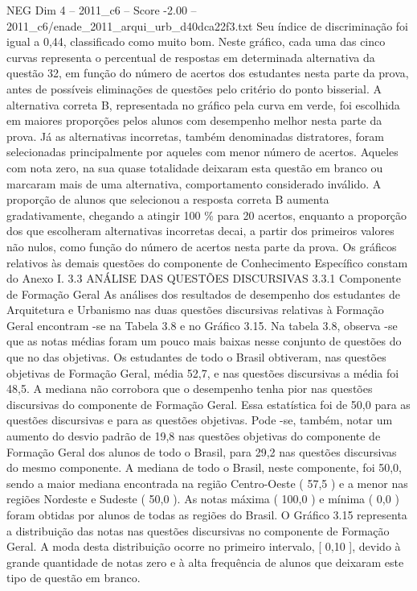 \begin{textsample}{NEG Dim 4 – 2011\_c6 – Score -2.00 – 2011\_c6/enade\_2011\_arqui\_urb\_d40dca22f3.txt}
Seu índice de discriminação foi igual a 0,44, classificado como muito bom.
Neste gráfico, cada uma das cinco curvas representa o percentual de respostas em determinada alternativa da questão 32, em função do número de acertos dos estudantes nesta parte da prova, antes de possíveis eliminações de questões pelo critério do ponto bisserial.
A alternativa correta B, representada no gráfico pela curva em verde, foi escolhida em maiores proporções pelos alunos com desempenho melhor nesta parte da prova.
Já as alternativas incorretas, também denominadas distratores, foram selecionadas principalmente por aqueles com menor número de acertos.
Aqueles com nota zero, na sua quase totalidade deixaram esta questão em branco ou marcaram mais de uma alternativa, comportamento considerado inválido.
A proporção de alunos que selecionou a resposta correta B aumenta gradativamente, chegando a atingir 100 \% para 20 acertos, enquanto a proporção dos que escolheram alternativas incorretas decai, a partir dos primeiros valores não nulos, como função do número de acertos nesta parte da prova.
Os gráficos relativos às demais questões do componente de Conhecimento Específico constam do Anexo I. 3.3 ANÁLISE DAS QUESTÕES DISCURSIVAS 3.3.1 Componente de Formação Geral As análises dos resultados de desempenho dos estudantes de Arquitetura e Urbanismo nas duas questões discursivas relativas à Formação Geral encontram -se na Tabela 3.8 e no Gráfico 3.15.
Na tabela 3.8, observa -se que as notas médias foram um pouco mais baixas nesse conjunto de questões do que no das objetivas.
Os estudantes de todo o Brasil obtiveram, nas questões objetivas de Formação Geral, média 52,7, e nas questões discursivas a média foi 48,5.
A mediana não corrobora que o desempenho tenha pior nas questões discursivas do componente de Formação Geral.
Essa estatística foi de 50,0 para as questões discursivas e para as questões objetivas.
Pode -se, também, notar um aumento do desvio padrão de 19,8 nas questões objetivas do componente de Formação Geral dos alunos de todo o Brasil, para 29,2 nas questões discursivas do mesmo componente.
A mediana de todo o Brasil, neste componente, foi 50,0, sendo a maior mediana encontrada na região Centro-Oeste ( 57,5 ) e a menor nas regiões Nordeste e Sudeste ( 50,0 ).
As notas máxima ( 100,0 ) e mínima ( 0,0 ) foram obtidas por alunos de todas as regiões do Brasil.
O Gráfico 3.15 representa a distribuição das notas nas questões discursivas no componente de Formação Geral.
A moda desta distribuição ocorre no primeiro intervalo, [ 0,10 ], devido à grande quantidade de notas zero e à alta frequência de alunos que deixaram este tipo de questão em branco.

\end{textsample}
